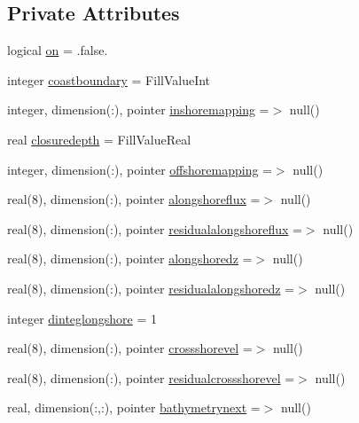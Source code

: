 \subsection*{Private Attributes}
\begin{DoxyCompactItemize}
\item 
logical \mbox{\hyperlink{structmodulesand_1_1t__hybridmorph_ab181d99f918969cbb40fdda5db4bc14f}{on}} = .false.
\item 
integer \mbox{\hyperlink{structmodulesand_1_1t__hybridmorph_a50e61037595f630b63df67647b9d6f23}{coastboundary}} = Fill\+Value\+Int
\item 
integer, dimension(\+:), pointer \mbox{\hyperlink{structmodulesand_1_1t__hybridmorph_a31b795970275ba8ea9cfcf22823982bb}{inshoremapping}} =$>$ null()
\item 
real \mbox{\hyperlink{structmodulesand_1_1t__hybridmorph_ac5e58afa263a42e9bf1a23c077ce4fd7}{closuredepth}} = Fill\+Value\+Real
\item 
integer, dimension(\+:), pointer \mbox{\hyperlink{structmodulesand_1_1t__hybridmorph_a14d3799912728500547c8384e281f637}{offshoremapping}} =$>$ null()
\item 
real(8), dimension(\+:), pointer \mbox{\hyperlink{structmodulesand_1_1t__hybridmorph_a5b66fce6228e5c57020039c44d0dd3ca}{alongshoreflux}} =$>$ null()
\item 
real(8), dimension(\+:), pointer \mbox{\hyperlink{structmodulesand_1_1t__hybridmorph_ab14ab26fe74e42a42df209f62aa935d2}{residualalongshoreflux}} =$>$ null()
\item 
real(8), dimension(\+:), pointer \mbox{\hyperlink{structmodulesand_1_1t__hybridmorph_a25db8371c7a387007ab3c0322f9c8a2f}{alongshoredz}} =$>$ null()
\item 
real(8), dimension(\+:), pointer \mbox{\hyperlink{structmodulesand_1_1t__hybridmorph_adf404a893dd474e4204f6f8031251636}{residualalongshoredz}} =$>$ null()
\item 
integer \mbox{\hyperlink{structmodulesand_1_1t__hybridmorph_a4095c596459bfd7f1494a4328fe5296a}{dinteglongshore}} = 1
\item 
real(8), dimension(\+:), pointer \mbox{\hyperlink{structmodulesand_1_1t__hybridmorph_a96a87ce93c317e3ea1b5eaebec00abf0}{crossshorevel}} =$>$ null()
\item 
real(8), dimension(\+:), pointer \mbox{\hyperlink{structmodulesand_1_1t__hybridmorph_a0dce3208e32bf04697d3c8e49cd71c6e}{residualcrossshorevel}} =$>$ null()
\item 
real, dimension(\+:,\+:), pointer \mbox{\hyperlink{structmodulesand_1_1t__hybridmorph_a7fd407ab3d648f689cb991c992758b59}{bathymetrynext}} =$>$ null()

\end{DoxyCompactItemize}
